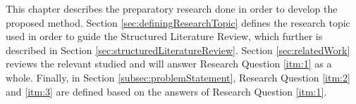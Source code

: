 This chapter describes the preparatory research done in order to develop the proposed method. Section \vref{sec:definingResearchTopic} defines the research topic used in order to guide the Structured Literature Review\citep{kofod2014}, which further is described in Section \vref{sec:structuredLiteratureReview}. Section \vref{sec:relatedWork} reviews the relevant studied and will answer Research Question \vref{itm:1} as a whole. Finally, in Section \vref{subsec:problemStatement}, Research Question \vref{itm:2} and \vref{itm:3} are defined based on the answers of Research Question \vref{itm:1}.  